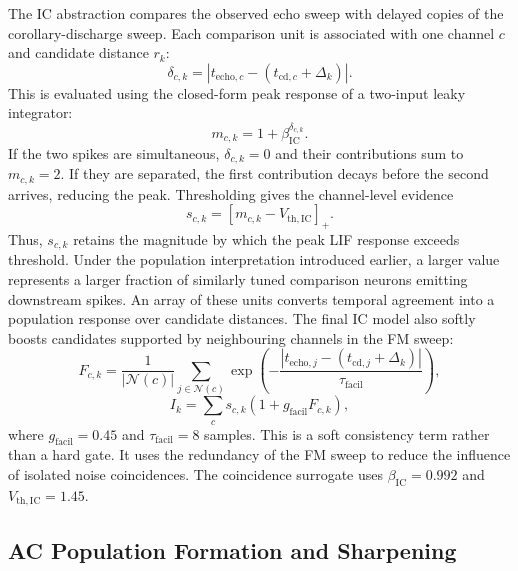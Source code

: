 The IC abstraction compares the observed echo sweep with delayed copies of the corollary-discharge sweep. Each comparison unit is associated with one channel $c$ and candidate distance $r_k$:
\begin{equation}
    \delta_{c,k}
    =
    \left|
    t_{\mathrm{echo},c}
    -
    (t_{\mathrm{cd},c}+\Delta_k)
    \right|.
\end{equation}
This is evaluated using the closed-form peak response of a two-input leaky integrator:
\begin{equation}
    m_{c,k}
    =
    1+\beta_{\mathrm{IC}}^{\delta_{c,k}}.
\end{equation}
If the two spikes are simultaneous, $\delta_{c,k}=0$ and their contributions sum to $m_{c,k}=2$. If they are separated, the first contribution decays before the second arrives, reducing the peak. Thresholding gives the channel-level evidence
\begin{equation}
    s_{c,k}
    =
    \left[
    m_{c,k}
    -
    V_{\mathrm{th,IC}}
    \right]_+.
\end{equation}
Thus, $s_{c,k}$ retains the magnitude by which the peak LIF response exceeds threshold. Under the population interpretation introduced earlier, a larger value represents a larger fraction of similarly tuned comparison neurons emitting downstream spikes. An array of these units converts temporal agreement into a population response over candidate distances. The final IC model also softly boosts candidates supported by neighbouring channels in the FM sweep:
\begin{equation}
    F_{c,k}
    =
    \frac{1}{|\mathcal{N}(c)|}
    \sum_{j \in \mathcal{N}(c)}
    \exp
    \left(
    -\frac{
    |t_{\mathrm{echo},j}-(t_{\mathrm{cd},j}+\Delta_k)|
    }{\tau_{\mathrm{facil}}}
    \right),
\end{equation}
\begin{equation}
    I_k
    =
    \sum_c s_{c,k}
    \left(1+g_{\mathrm{facil}}F_{c,k}\right),
\end{equation}
where $g_{\mathrm{facil}}=0.45$ and $\tau_{\mathrm{facil}}=8$ samples. This is a soft consistency term rather than a hard gate. It uses the redundancy of the FM sweep to reduce the influence of isolated noise coincidences.
The coincidence surrogate uses $\beta_{\mathrm{IC}}=0.992$ and $V_{\mathrm{th,IC}}=1.45$.

\subsection{AC Population Formation and Sharpening}

